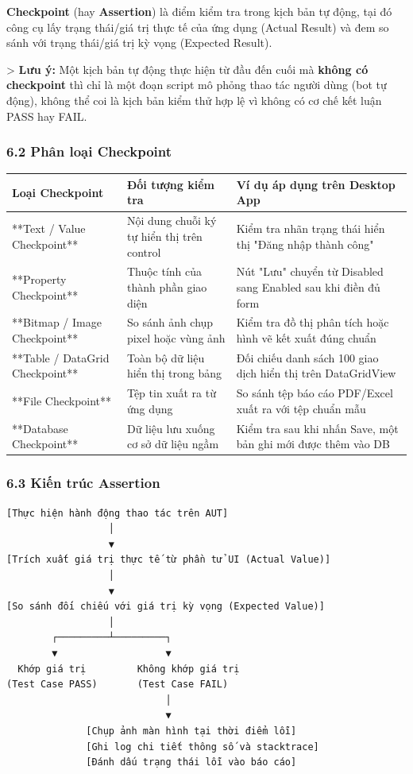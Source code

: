 \textbf{Checkpoint} (hay \textbf{Assertion}) là điểm kiểm tra trong kịch bản tự động, tại đó công cụ lấy trạng thái/giá trị thực tế của ứng dụng (Actual Result) và đem so sánh với trạng thái/giá trị kỳ vọng (Expected Result).

> \textbf{Lưu ý:} Một kịch bản tự động thực hiện từ đầu đến cuối mà \textbf{không có checkpoint} thì chỉ là một đoạn script mô phỏng thao tác người dùng (bot tự động), không thể coi là kịch bản kiểm thử hợp lệ vì không có cơ chế kết luận PASS hay FAIL.

\subsubsection{6.2 Phân loại Checkpoint}

\begin{table}[H]
\centering
\begin{tabular}{|l|l|l|}
\hline
\textbf{Loại Checkpoint} & \textbf{Đối tượng kiểm tra} & \textbf{Ví dụ áp dụng trên Desktop App} \\ \hline
**Text / Value Checkpoint** & Nội dung chuỗi ký tự hiển thị trên control & Kiểm tra nhãn trạng thái hiển thị "Đăng nhập thành công" \\ \hline
**Property Checkpoint** & Thuộc tính của thành phần giao diện & Nút "Lưu" chuyển từ Disabled sang Enabled sau khi điền đủ form \\ \hline
**Bitmap / Image Checkpoint** & So sánh ảnh chụp pixel hoặc vùng ảnh & Kiểm tra đồ thị phân tích hoặc hình vẽ kết xuất đúng chuẩn \\ \hline
**Table / DataGrid Checkpoint** & Toàn bộ dữ liệu hiển thị trong bảng & Đối chiếu danh sách 100 giao dịch hiển thị trên DataGridView \\ \hline
**File Checkpoint** & Tệp tin xuất ra từ ứng dụng & So sánh tệp báo cáo PDF/Excel xuất ra với tệp chuẩn mẫu \\ \hline
**Database Checkpoint** & Dữ liệu lưu xuống cơ sở dữ liệu ngầm & Kiểm tra sau khi nhấn Save, một bản ghi mới được thêm vào DB \\ \hline
\end{tabular}
\end{table}




\subsubsection{6.3 Kiến trúc Assertion}

\begin{lstlisting}
[Thực hiện hành động thao tác trên AUT]
                  │
                  ▼
[Trích xuất giá trị thực tế từ phần tử UI (Actual Value)]
                  │
                  ▼
[So sánh đối chiếu với giá trị kỳ vọng (Expected Value)]
                  │
        ┌─────────┴─────────┐
        ▼                   ▼
  Khớp giá trị         Không khớp giá trị
(Test Case PASS)       (Test Case FAIL)
                            │
                            ▼
              [Chụp ảnh màn hình tại thời điểm lỗi]
              [Ghi log chi tiết thông số và stacktrace]
              [Đánh dấu trạng thái lỗi vào báo cáo]
\end{lstlisting}



